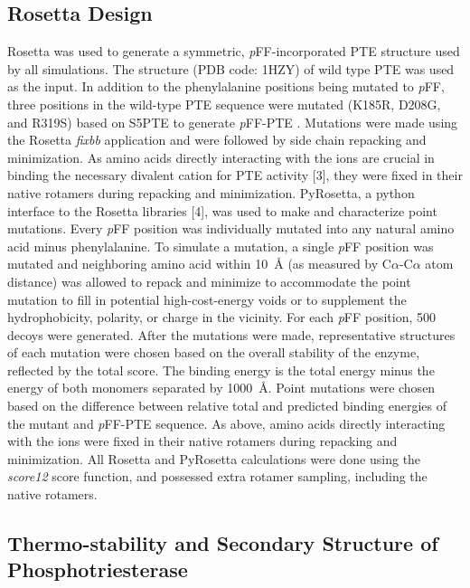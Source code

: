 \begin{refsection}
\subsection{Rosetta Design}
\label{sec:pyrosetta-method}

Rosetta \cite{Leaver-Fay2011,DiMaio2011a} was used to generate a symmetric,
\emph{p}FF-incorporated PTE structure used by all simulations. The structure
(PDB code: 1HZY) of wild type PTE was used as the input. In addition to the
phenylalanine positions being mutated to \emph{p}FF, three positions in the
wild-type PTE sequence were mutated (K185R, D208G, and R319S) based on S5PTE to
generate \emph{p}FF-PTE \cite{Roodveldt2005}. Mutations were made using the
Rosetta \emph{fixbb} application and were followed by side chain repacking and
minimization. As amino acids directly interacting with the  ions
are crucial in binding the necessary divalent cation for PTE activity [3], 
they were fixed in their native rotamers during repacking and minimization.
PyRosetta, a python interface to the Rosetta libraries [4], was used to make and
characterize point mutations. Every \emph{p}FF position was individually
mutated into any natural amino acid minus phenylalanine. To simulate a
mutation, a single \emph{p}FF position was mutated and neighboring amino acid
within \SI{10}{\angstrom} (as measured by C$\alpha$-C$\alpha$ atom distance) was
allowed to repack and minimize to accommodate the point mutation to fill in
potential high-cost-energy voids or to supplement the hydrophobicity, polarity,
or charge in the vicinity. For each \emph{p}FF position, 500 decoys were
generated. After the mutations were made, representative structures of each
mutation were chosen based on the overall stability of the enzyme, reflected by
the total score. The binding energy is the total energy minus the energy of
both monomers separated by \SI{1000}{\angstrom}. Point mutations were chosen
based on the difference between relative total and predicted binding energies
of the mutant and \emph{p}FF-PTE sequence. As above, amino acids directly
interacting with the  ions were fixed in their native rotamers
during repacking and minimization. All Rosetta and PyRosetta calculations were
done using the \emph{score12} score function, and possessed extra rotamer
sampling, including the native rotamers.

\subsection{Thermo-stability and Secondary Structure of Phosphotriesterase}
\label{sec:thermo}


\end{refsection}
